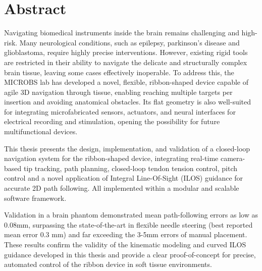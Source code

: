


\section*{Abstract}
Navigating biomedical instruments inside the brain remains challenging and high-risk. Many neurological conditions, such as epilepsy, parkinson's disease and glioblastoma, require highly precise interventions. However, existing rigid tools are restricted in their ability to navigate the delicate and structurally complex brain tissue, leaving some cases effectively inoperable. To address this, the MICROBS lab has developed a novel, flexible, ribbon-shaped device capable of agile 3D navigation through tissue, enabling reaching multiple targets per insertion and avoiding anatomical obstacles. Its flat geometry is also well-suited for integrating microfabricated sensors, actuators, and neural interfaces for electrical recording and stimulation, opening the possibility for future multifunctional devices. 

This thesis presents the design, implementation, and validation of a closed-loop navigation system for the ribbon-shaped device, integrating real-time camera-based tip tracking, path planning, closed-loop tendon tension control, pitch control and a novel application of Integral Line-Of-Sight (ILOS) guidance for accurate 2D path following. All implemented within a modular and scalable software framework.

Validation in a brain phantom demonstrated mean path-following errors as low as 0.08mm, surpassing the state-of-the-art in flexible needle steering (best reported mean error 0.3 mm) and far exceeding the 3-5mm errors of manual placement. These results confirm the validity of the kinematic modeling and curved ILOS guidance developed in this thesis and provide a clear proof-of-concept for precise, automated control of the ribbon device in soft tissue environments. 

